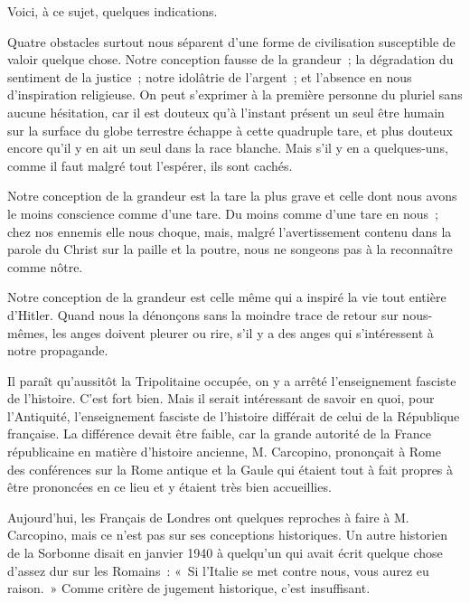 \documentclass[french,twoside]{book} %
\begin{document}
Voici, à ce sujet, quelques indications.\par
Quatre obstacles surtout nous séparent d'une forme de civilisation susceptible de valoir quelque chose. Notre conception fausse de la grandeur ; la dégradation du sentiment de la justice ; notre idolâtrie de l'argent ; et l'absence en nous d'inspiration religieuse. On peut s'exprimer à la première personne du pluriel sans aucune hésitation, car il est douteux qu'à l'instant présent un seul être humain sur la surface du globe terrestre échappe à cette quadruple tare, et plus douteux encore qu'il y en ait un seul dans la race blanche. Mais s'il y en a quelques-uns, comme il faut malgré tout l'espérer, ils sont cachés.\par
Notre conception de la grandeur est la tare la plus grave et celle dont nous avons le moins conscience comme d'une tare. Du moins comme d'une tare en nous ; chez nos ennemis elle nous choque, mais, malgré l'avertissement contenu dans la parole du Christ sur la paille et la poutre, nous ne songeons pas à la reconnaître comme nôtre.\par
Notre conception de la grandeur est celle même qui a inspiré la vie tout entière d'Hitler. Quand nous la dénonçons sans la moindre trace de retour sur nous-mêmes, les anges doivent pleurer ou rire, s'il y a des anges qui s'intéressent à notre propagande.\par
Il paraît qu'aussitôt la Tripolitaine occupée, on y a arrêté l'enseignement fasciste de l'histoire. C'est fort bien. Mais il serait intéressant de savoir en quoi, pour l'Antiquité, l'enseignement fasciste de l'histoire différait de celui de la République française. La différence devait être faible, car la grande autorité de la France républicaine en matière d'histoire ancienne, M. Carcopino, prononçait à Rome des conférences sur la Rome antique et la Gaule qui étaient tout à fait propres à être prononcées en ce lieu et y étaient très bien accueillies.\par
Aujourd'hui, les Français de Londres ont quelques reproches à faire à M. Carcopino, mais ce n'est pas sur ses conceptions historiques. Un autre historien de la Sorbonne disait en janvier 1940 à quelqu'un qui avait écrit quelque chose d'assez dur sur les Romains : « Si l'Italie se met contre nous, vous aurez eu raison. » Comme critère de jugement historique, c'est insuffisant.\par
\end{document}
